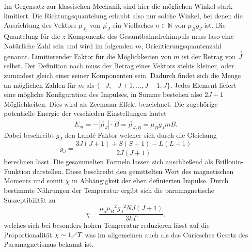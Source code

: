 Im Gegensatz zur klassischen Mechanik sind hier die möglichen Winkel stark limitiert. Die Richtungsquantelung erlaubt also nur solche Winkel, 
bei denen die Ausrichtung des Vektors $\mu_{J_z}$ von $\vec{\mu}_J$ ein Vielfaches $n \in \mathbb{N} $ von $\mu_B g_J$ ist. 
Die Quantelung für die $z$-Komponente des Gesamtbahndrehimpuls muss laso 
eine Natürliche Zahl sein und wird im folgenden $m$, Orientierungsquantenzahl genannt.
Limitierender Faktor für die Möglichkeiten von $m$ ist der Betrag von $\vec{J}$ selbst. Der Definition nach muss der 
Betrag eines Vektors stehts kleiner, oder zumindest gleich einer seiner Komponenten sein. Dadurch findet sich die Menge an 
möglichen Zahlen für $m$ als $\{-J,-J+1,...,J-1,J\}$. Jedes Element liefert eine mögliche Konfiguration des Impulses, in Summe 
bestehen also $2J+1$ Möglichkeiten. Dies wird als Zeemann-Effekt bezeichnet. Die zugehörige potentielle Energie der veschieden Einstellungen lautet
\begin{equation*}
    E_m=-|\vec{\mu}_J|\cdot\vec{B}  = \vec{\mu}_{{J_z}B}= \mu_B g_J mB.
\end{equation*}
Dabei beschreibt $g_J$ den Landé-Faktor welcher sich durch die Gleichung
\begin{equation}
    \label{eqn:landeeq}
    g_J = \frac{3J(J+1) + S(S+1) -L(L+1)}{2J(J+1)}
\end{equation}
berechnen lässt.
Die gesammelten Formeln lassen sich anschließend als Brillouin-Funktion darstellen. Diese beschreibt den gemittelten Wert 
des magnetischen Moments und somit $\chi$ in Abhängigkeit der eben definierten Impulse. Durch bestimmte Nährungen der Temperatur ergibt sich
die paramagnetische Suszeptibilität zu
\begin{equation}
    \label{eqn:CHIIII}
    \chi =  \frac{\mu_o {\mu_B}^2 {g_J}^2 N J(J+1) }{3kT},
\end{equation}
welches sich bei besonders hohen Temperatur reduzieren lässt auf die Proportionalität $\chi \sim 1 \diagup T$ was im allgemeinen
auch als das Curiesches Gesetz des Paramagnetismus bekannt ist.


